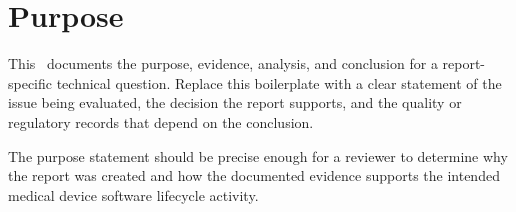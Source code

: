\section{Purpose}
This \stdTechReport\ documents the purpose, evidence, analysis, and conclusion
for a report-specific technical question.  Replace this boilerplate with a clear
statement of the issue being evaluated, the decision the report supports, and
the quality or regulatory records that depend on the conclusion.

\tlcVspace

The purpose statement should be precise enough for a reviewer to determine why
the report was created and how the documented evidence supports the intended
medical device software lifecycle activity.
